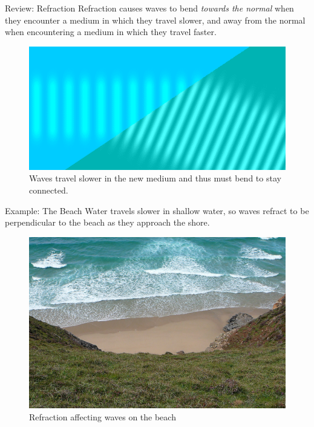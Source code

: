 \documentclass{beamer}
\begin{document}
\begin{frame}{Review: Refraction}
    Refraction causes waves to bend \textit{towards the normal} when they encounter a medium in which they travel slower, and away from the normal when encountering a medium in which they travel faster. 
    
    \begin{figure}
        \centering
        \includegraphics[scale=.6]{refractionwaves.png}
        \caption{Waves travel slower in the new medium and thus must bend to stay connected.}
        \label{fig:refraction_waves}
    \end{figure}
\end{frame}

\begin{frame}{Example: The Beach}
    Water travels slower in shallow water, so waves refract to be perpendicular to the beach as they approach the shore.
    \begin{figure}
        \centering
        \includegraphics[scale=.11]{waves.jpg}
        \caption{Refraction affecting waves on the beach}
        \label{fig:refraction_beach}
    \end{figure}
\end{frame}
\end{document}
